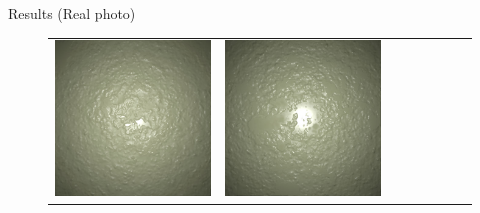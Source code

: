 \documentclass[final]{beamer}
\newlength{\twocolwid}
\newlength{\resultwidth}
\begin{document}
\begin{frame}[t]
\begin{columns}[t]
\begin{column}{\twocolwid}
\begin{block}{Results (Real photo)}
\begin{figure}[t]
\begin{tabular}{ccrclccc}
            		\includegraphics[width=\resultwidth]{real/plaster/good2.jpg} &
            		\includegraphics[width=\resultwidth]{real/plaster/good3.jpg} &

\end{tabular}
\end{figure}
\end{block}
\end{column}
\end{columns}
\end{frame}
\end{document}
